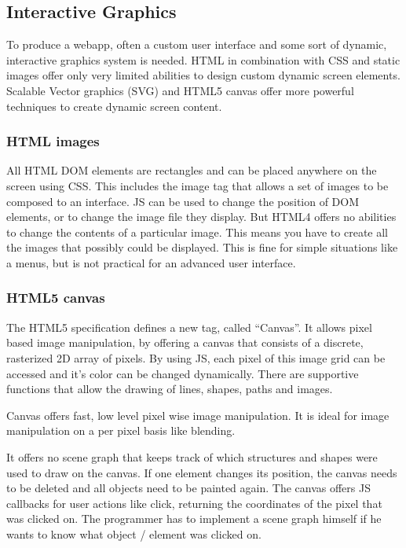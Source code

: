 \subsection{Interactive Graphics}
\label{sec:graphics}

To produce a webapp, often a custom user interface and some sort of dynamic, interactive graphics system is needed.
HTML in combination with CSS and static images offer only very limited abilities to design custom dynamic screen elements.
Scalable Vector graphics (SVG) and HTML5 canvas offer more powerful techniques to create dynamic screen content.


\subsubsection{HTML images}
\label{sec:htmlimg}

All HTML DOM elements are rectangles and can be placed anywhere on the screen using CSS.
This includes the image tag  that allows a set of images to be composed to an interface.
JS can be used to change the position of DOM elements, or to change the image file they display.
But HTML4 offers no abilities to change the contents of a particular image. This means you have to create all the images that possibly could be displayed.
This is fine for simple situations like a menus, but is not practical for an advanced user interface.


\subsubsection{HTML5 canvas}
\label{sec:canvas}

The HTML5 specification defines a new tag, called ``Canvas''.
It allows pixel based image manipulation, by offering a canvas that consists of a discrete, rasterized 2D array of pixels.
By using JS, each pixel of this image grid can be accessed and it's color can be changed dynamically.
There are supportive functions that allow the drawing of lines, shapes, paths and images.

Canvas offers fast, low level pixel wise image manipulation.
It is ideal for image manipulation on a per pixel basis like blending.

It offers no scene graph that keeps track of which structures and shapes were used to draw on the canvas.
If one element changes its position, the canvas needs to be deleted and all objects need to be painted again.
The canvas offers JS callbacks for user actions like click, returning the coordinates of the pixel that was clicked on.
The programmer has to implement a scene graph himself if he wants to know what object / element was clicked on.

